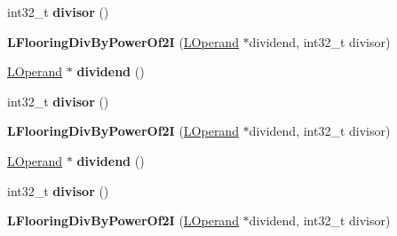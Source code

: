 \begin{DoxyCompactItemize}
\item 
int32\+\_\+t {\bfseries divisor} ()\hypertarget{classv8_1_1internal_1_1_l_flooring_div_by_power_of2_i_add8008d5ac66988cdbd9cec436d070e0}{}\label{classv8_1_1internal_1_1_l_flooring_div_by_power_of2_i_add8008d5ac66988cdbd9cec436d070e0}

\item 
{\bfseries L\+Flooring\+Div\+By\+Power\+Of2I} (\hyperlink{classv8_1_1internal_1_1_l_operand}{L\+Operand} $\ast$dividend, int32\+\_\+t divisor)\hypertarget{classv8_1_1internal_1_1_l_flooring_div_by_power_of2_i_a1dd3730a11d9841227cfb9e917532a0d}{}\label{classv8_1_1internal_1_1_l_flooring_div_by_power_of2_i_a1dd3730a11d9841227cfb9e917532a0d}

\item 
\hyperlink{classv8_1_1internal_1_1_l_operand}{L\+Operand} $\ast$ {\bfseries dividend} ()\hypertarget{classv8_1_1internal_1_1_l_flooring_div_by_power_of2_i_aee291ceb584b7a64ac7eaa1031c2a8cc}{}\label{classv8_1_1internal_1_1_l_flooring_div_by_power_of2_i_aee291ceb584b7a64ac7eaa1031c2a8cc}

\item 
int32\+\_\+t {\bfseries divisor} ()\hypertarget{classv8_1_1internal_1_1_l_flooring_div_by_power_of2_i_add8008d5ac66988cdbd9cec436d070e0}{}\label{classv8_1_1internal_1_1_l_flooring_div_by_power_of2_i_add8008d5ac66988cdbd9cec436d070e0}

\item 
{\bfseries L\+Flooring\+Div\+By\+Power\+Of2I} (\hyperlink{classv8_1_1internal_1_1_l_operand}{L\+Operand} $\ast$dividend, int32\+\_\+t divisor)\hypertarget{classv8_1_1internal_1_1_l_flooring_div_by_power_of2_i_a1dd3730a11d9841227cfb9e917532a0d}{}\label{classv8_1_1internal_1_1_l_flooring_div_by_power_of2_i_a1dd3730a11d9841227cfb9e917532a0d}

\item 
\hyperlink{classv8_1_1internal_1_1_l_operand}{L\+Operand} $\ast$ {\bfseries dividend} ()\hypertarget{classv8_1_1internal_1_1_l_flooring_div_by_power_of2_i_aee291ceb584b7a64ac7eaa1031c2a8cc}{}\label{classv8_1_1internal_1_1_l_flooring_div_by_power_of2_i_aee291ceb584b7a64ac7eaa1031c2a8cc}

\item 
int32\+\_\+t {\bfseries divisor} ()\hypertarget{classv8_1_1internal_1_1_l_flooring_div_by_power_of2_i_add8008d5ac66988cdbd9cec436d070e0}{}\label{classv8_1_1internal_1_1_l_flooring_div_by_power_of2_i_add8008d5ac66988cdbd9cec436d070e0}

\item 
{\bfseries L\+Flooring\+Div\+By\+Power\+Of2I} (\hyperlink{classv8_1_1internal_1_1_l_operand}{L\+Operand} $\ast$dividend, int32\+\_\+t divisor)\hypertarget{classv8_1_1internal_1_1_l_flooring_div_by_power_of2_i_a1dd3730a11d9841227cfb9e917532a0d}{}\label{classv8_1_1internal_1_1_l_flooring_div_by_power_of2_i_a1dd3730a11d9841227cfb9e917532a0d}


\end{DoxyCompactItemize}
